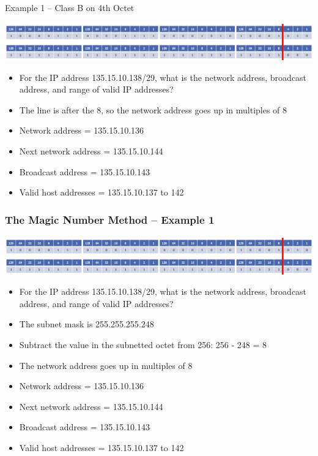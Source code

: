 \documentclass[pdflatex,compress]{beamer}
\begin{document}
\begin{frame}{Example 1 – Class B on 4th Octet}
	\begin{center}
		\includegraphics[width=\linewidth]{img/img18}
	\end{center}
	\begin{itemize}
		\item<1-> For the IP address 135.15.10.138/29, what is the network address, broadcast address, and range of valid IP addresses?
		\item<2-> The line is after the 8, so the network address goes up in multiples of 8
		\item<2-> Network address = 135.15.10.136
		\item<2-> Next network address = 135.15.10.144
		\item<2-> Broadcast address = 135.15.10.143
		\item<2-> Valid host addresses = 135.15.10.137 to 142
	\end{itemize}
\end{frame}

\begin{frame}
	\frametitle{The Magic Number Method – Example 1}
	\begin{center}
		\includegraphics[width=\linewidth]{img/img18}
	\end{center}
	\begin{itemize}
		\item For the IP address 135.15.10.138/29, what is the network address, broadcast address, and range of valid IP addresses?
		\item The subnet mask is 255.255.255.248
		\item Subtract the value in the subnetted octet from 256: 256 - 248 = 8
		\item The network address goes up in multiples of 8
		\item Network address = 135.15.10.136
		\item Next network address = 135.15.10.144
		\item Broadcast address = 135.15.10.143
		\item Valid host addresses = 135.15.10.137 to 142
	\end{itemize}
\end{frame}
\end{document}
